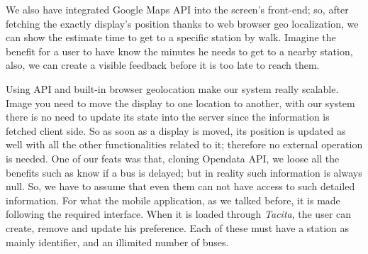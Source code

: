 \documentclass[]{usiinfbachelorproject}
\begin{document}
We also have integrated Google Maps API into the screen's front-end; so, after fetching the exactly display's position thanks to web browser geo localization, we can show the estimate time to get to a specific station by walk. Imagine the benefit for a user to have know the minutes he needs to get to a nearby station, also, we can create a visible feedback before it is too late to reach them.

Using API and built-in browser geolocation make our system really scalable. Image you need to move the display to one location to another, with our system there is no need to update its state into the server since the information is fetched client side. So as soon as a display is moved, its position is updated as well with all the other functionalities related to it; therefore no external operation is needed.
One of our feats was that, cloning Opendata API, we loose all the benefits such as know if a bus is delayed; but in reality such information is always null. So, we have to assume that even them can not have access to such detailed information.
For what the mobile application, as we talked before, it is made following the required interface. When it is loaded through \emph{Tacita}, the user can create, remove and update his preference. Each of these must have a station as mainly identifier, and an illimited number of buses.
\end{document}
